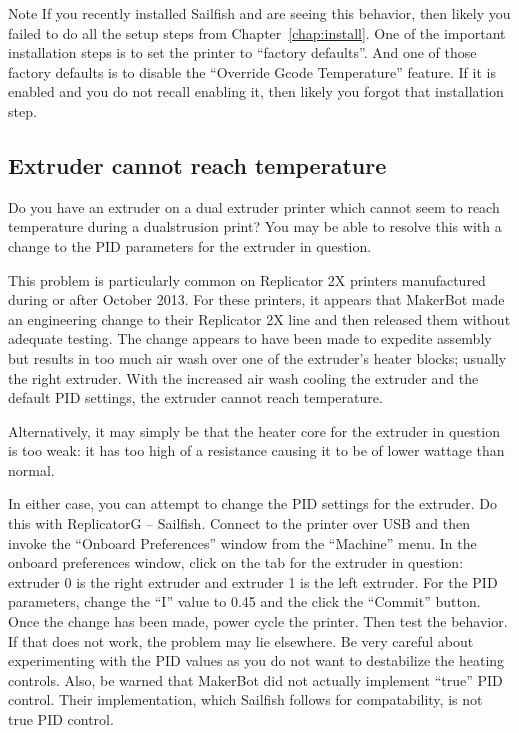 \begin{bclogo}[logo=\bcinfo, noborder=true, couleurBarre=yellow]{Note}
If you recently installed Sailfish and are seeing this behavior, then likely
you failed to do all the setup steps from Chapter~\ref{chap:install}.  One
of the important installation steps is to set the printer to ``factory
defaults''.  And one of those factory defaults is to disable the ``Override
Gcode Temperature'' feature.  If it is enabled and you do not recall
enabling it, then likely you forgot that installation step.
\end{bclogo}

\subsection{Extruder cannot reach temperature}

Do you have an extruder on a dual extruder printer which cannot seem to reach
temperature during a \gls{dualstrusion} print?  You may be able to resolve
this with a change to the PID parameters for the extruder in question.

This problem is particularly common on Replicator 2X printers manufactured
during or after October 2013.  For these printers, it appears that MakerBot made
an engineering change to their Replicator 2X line and then released them without
adequate testing.  The change appears to have been made to expedite assembly
but results in too much air wash over one of the extruder's heater blocks; usually the right extruder.  With the increased air wash cooling the
extruder and the default PID settings, the extruder cannot reach temperature.

Alternatively, it may simply be that the heater core for the extruder in
question is too weak: it has too high of a resistance causing it to be of
lower wattage than normal.

In either case, you can attempt to change the PID settings for the
extruder.  Do this with ReplicatorG -- Sailfish.  Connect to the printer
over USB and then invoke the ``Onboard Preferences'' window from the
``Machine'' menu.  In the onboard preferences window, click on the
tab for the extruder in question: extruder 0 is the right extruder
and extruder 1 is the left extruder.  For the PID parameters, change the ``I''
value to 0.45 and the click the ``Commit'' button.  Once the change has
been made, power cycle the printer.  Then test the behavior.  If that does not
work, the problem may lie elsewhere.  Be very careful about experimenting
with the PID values as you do not want to destabilize the heating controls.
Also, be warned that MakerBot did not actually implement ``true'' PID
control.  Their implementation, which Sailfish follows for compatability,
is not true PID control.

